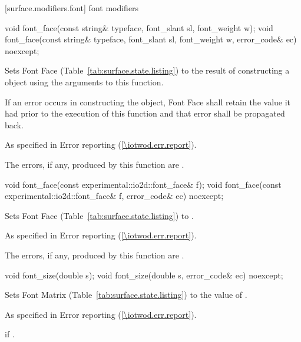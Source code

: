  [surface.modifiers.font] { font modifiers}

\begin{itemdecl}
void font_face(const string& typeface, font_slant sl, font_weight w);
void font_face(const string& typeface, font_slant sl, font_weight w,
  error_code& ec) noexcept;
\end{itemdecl}
\begin{itemdescr}
\pnum
\effects
Sets Font Face (Table~\ref{tab:surface.state.listing}) to the result of constructing a  object using the arguments to this function.

\pnum
If an error occurs in constructing the  object, Font Face shall retain the value it had prior to the execution of this function and that error shall be propagated back.

\pnum
\throws
As specified in Error reporting (\ref{\iotwod.err.report}).

\pnum
\errors
The errors, if any, produced by this function are .
\end{itemdescr}

\begin{itemdecl}
void font_face(const experimental::io2d::font_face& f);
void font_face(const experimental::io2d::font_face& f, error_code& ec)
  noexcept;
\end{itemdecl}
\begin{itemdescr}
\pnum
\effects
Sets Font Face (Table~\ref{tab:surface.state.listing}) to .

\pnum
\throws
As specified in Error reporting (\ref{\iotwod.err.report}).

\pnum
\errors
The errors, if any, produced by this function are .
\end{itemdescr}

\begin{itemdecl}
void font_size(double s);
void font_size(double s, error_code& ec) noexcept;
\end{itemdecl}
\begin{itemdescr}
\pnum
\effects
Sets Font Matrix (Table~\ref{tab:surface.state.listing}) to the value of .

\pnum
\throws
As specified in Error reporting (\ref{\iotwod.err.report}).

\pnum
\errors
{} if .
\end{itemdescr}

